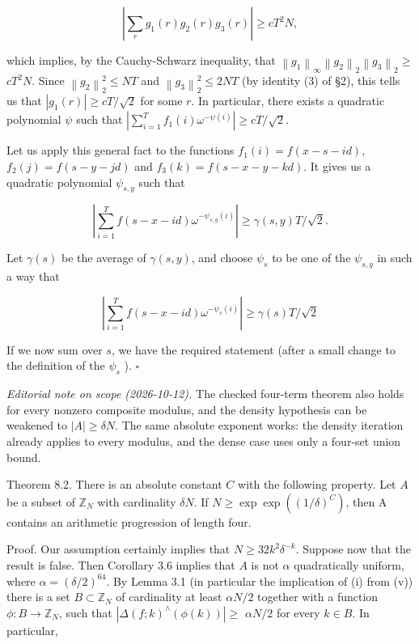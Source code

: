 \documentclass[10pt]{article}
\begin{document}
$$
\left|\sum_{r} g_{1}(r) g_{2}(r) g_{3}(r)\right| \geqslant c T^{2} N,
$$

which implies, by the Cauchy-Schwarz inequality, that $\left\|g_{1}\right\|_{\infty}\left\|g_{2}\right\|_{2}\left\|g_{3}\right\|_{2} \geqslant$ $c T^{2} N$. Since $\left\|g_{2}\right\|_{2}^{2} \leqslant N T$ and $\left\|g_{3}\right\|_{2}^{2} \leqslant 2 N T$ (by identity (3) of §2), this tells us that $\left|g_{1}(r)\right| \geqslant c T / \sqrt{2}$ for some $r$. In particular, there exists a quadratic polynomial $\psi$ such that $\left|\sum_{i=1}^{T} f_{1}(i) \omega^{-\psi(i)}\right| \geqslant c T / \sqrt{2}$.

Let us apply this general fact to the functions $f_{1}(i)=f(x-s-i d)$, $f_{2}(j)=f(s-y-j d)$ and $f_{3}(k)=f(s-x-y-k d)$. It gives us a quadratic polynomial $\psi_{s, y}$ such that

$$
\left|\sum_{i=1}^{T} f(s-x-i d) \omega^{-\psi_{s, y}(i)}\right| \geqslant \gamma(s, y) T / \sqrt{2} .
$$

Let $\gamma(s)$ be the average of $\gamma(s, y)$, and choose $\psi_{s}$ to be one of the $\psi_{s, y}$ in such a way that

$$
\left|\sum_{i=1}^{T} f(s-x-i d) \omega^{-\psi_{s}(i)}\right| \geqslant \gamma(s) T / \sqrt{2}
$$

If we now sum over $s$, we have the required statement (after a small change to the definition of the $\psi_{s}$ ). \(\square\)

\emph{Editorial note on scope (2026-10-12).}
The checked four-term theorem also holds for every nonzero composite
modulus, and the density hypothesis can be weakened to $|A|\geqslant\delta N$.
The same absolute exponent works: the density iteration already applies
to every modulus, and the dense case uses only a four-set union bound.

Theorem 8.2. There is an absolute constant $C$ with the following property. Let $A$ be a subset of $\mathbb{Z}_{N}$ with cardinality $\delta N$. If $N \geqslant \exp \exp \left((1 / \delta)^{C}\right)$, then A contains an arithmetic progression of length four.

Proof. Our assumption certainly implies that $N \geqslant 32 k^{2} \delta^{-k}$. Suppose now that the result is false. Then Corollary 3.6 implies that $A$ is not $\alpha$ quadratically uniform, where $\alpha=(\delta / 2)^{64}$. By Lemma 3.1 (in particular the implication of (i) from (v)) there is a set $B \subset \mathbb{Z}_{N}$ of cardinality at least $\alpha N / 2$ together with a function $\phi: B \rightarrow \mathbb{Z}_{N}$, such that $\left|\Delta(f ; k)^{\wedge}(\phi(k))\right| \geqslant$ $\alpha N / 2$ for every $k \in B$. In particular,
\end{document}
